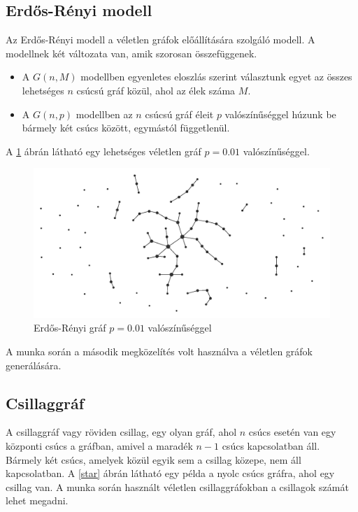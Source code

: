 \documentclass[12pt]{report}
\begin{document}
\pagebreak

\subsection{Erdős-Rényi modell}

Az Erdős-Rényi modell \cite{erdos59a} a véletlen gráfok előállítására szolgáló modell.
A modellnek két változata van, amik szorosan összefüggenek.
\begin{itemize}
	\item A \(G(n, M)\) modellben egyenletes eloszlás szerint választunk egyet az összes lehetséges \(n\) csúcsú gráf közül, ahol az élek száma \(M\).
	\item A \(G(n, p)\) modellben az \(n\) csúcsú gráf éleit \(p\) valószínűséggel húzunk be bármely két csúcs között, egymástól függetlenül.
\end{itemize}

A \ref{erdos} ábrán látható egy lehetséges véletlen gráf \(p=0.01\) valószínűséggel.

\begin{figure}[H]
	\begin{center}
		\includegraphics[width=0.9\linewidth]{pictures/Erdos_generated_network-p001.jpg}
		\caption{Erdős-Rényi gráf \(p=0.01\) valószínűséggel \cite{wikipedia_erdos}}
		\label{erdos}
	\end{center}
\end{figure}

A munka során a második megközelítés volt használva a véletlen gráfok generálására.

\subsection{Csillaggráf}

A csillaggráf vagy röviden csillag, egy olyan gráf, ahol \(n\) csúcs esetén van egy központi csúcs a gráfban, amivel a maradék \(n-1\) csúcs kapcsolatban áll.
Bármely két csúcs, amelyek közül egyik sem a csillag közepe, nem áll kapcsolatban.
A \ref{star} ábrán látható egy példa a nyolc csúcs gráfra, ahol egy csillag van.
A munka során használt véletlen csillaggráfokban a csillagok számát lehet megadni.
\end{document}
